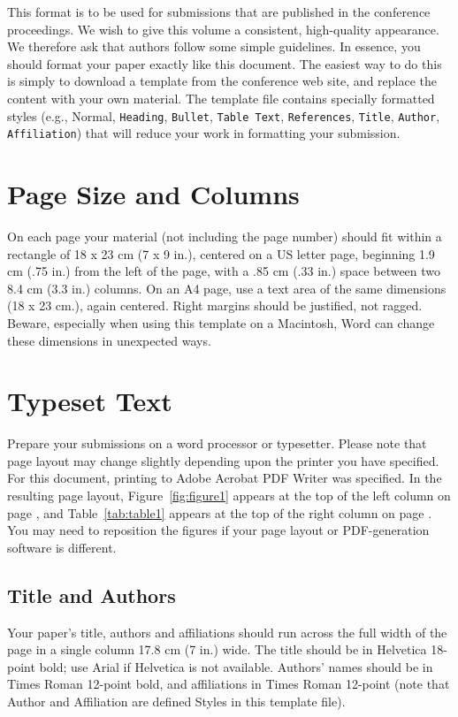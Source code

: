 \documentclass{chi2012}
\begin{document}
This format is to be used for submissions that are
published in the conference proceedings.  We wish to give
this volume a consistent, high-quality appearance. We
therefore ask that authors follow some simple
guidelines. In essence, you should format your paper
exactly like this document. The easiest way to do this is
simply to download a template from the conference web
site, and replace the content with your own material. The
template file contains specially formatted styles (e.g.,
Normal, \texttt{Heading}, \texttt{Bullet}, \texttt{Table
  Text}, \texttt{References}, \texttt{Title},
\texttt{Author}, \texttt{Affiliation}) that will reduce
your work in formatting your submission.

\section{Page Size and Columns}

On each page your material (not including the page number) should fit
within a rectangle of 18 x 23 cm (7 x 9 in.), centered on a US
letter page, beginning 1.9 cm (.75 in.) from the left of the page, with
a .85 cm (.33 in.) space between two 8.4 cm (3.3 in.) columns.  On an
A4 page, use a text area of the same dimensions (18 x 23 cm.), again
centered.  Right margins should be justified, not ragged. Beware,
especially when using this template on a Macintosh, Word can change
these dimensions in unexpected ways.

\section{Typeset Text}

Prepare your submissions on a word processor or typesetter.  Please
note that page layout may change slightly depending upon the printer
you have specified.  For this document, printing to Adobe Acrobat PDF
Writer was specified.  In the resulting page layout,
Figure~\ref{fig:figure1} appears at the top of the left column on page
\pageref{fig:figure1}, and Table~\ref{tab:table1} appears at the top
of the right column on page \pageref{tab:table1}.  You may need to
reposition the figures if your page layout or PDF-generation software
is different.

\subsection{Title and Authors}

Your paper's title, authors and affiliations should run across the
full width of the page in a single column 17.8 cm (7 in.) wide.  The
title should be in Helvetica 18-point bold; use Arial if Helvetica is
not available.  Authors' names should be in Times Roman 12-point bold,
and affiliations in Times Roman 12-point (note that Author and
Affiliation are defined Styles in this template file).
\end{document}
